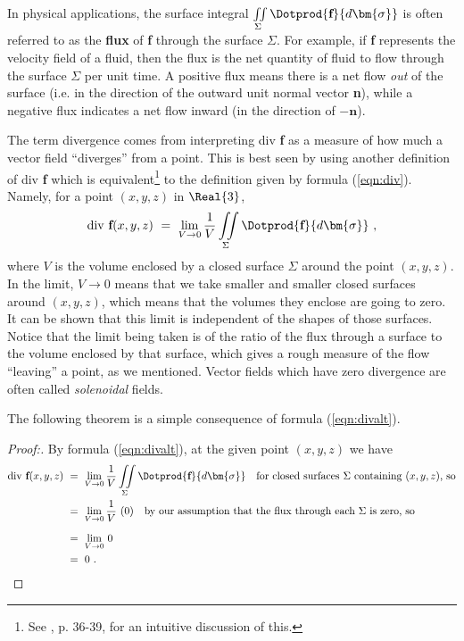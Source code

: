 In physical applications, the surface integral $\iint\limits_{\Sigma} \Dotprod{\textbf{f}}{d\bm{\sigma}}$ is often
referred to as the \textbf{flux} of \textbf{f} through the surface $\Sigma$. For example, if \textbf{f}
represents the velocity field of a fluid, then the flux
is the net quantity of fluid to flow through the surface $\Sigma$ per unit time. A
positive flux means there is a net flow \emph{out} of the surface (i.e. in the direction of the outward
unit normal vector \textbf{n}), while a negative flux indicates a net flow inward (in the direction of
$-\textbf{n}$).

The term divergence comes from interpreting div \textbf{f} as a measure of how much a vector field ``diverges''
from a point. This is best seen by using another definition of div \textbf{f} which is
equivalent\footnote{See \cite{sch}, p. 36-39, for an intuitive discussion of this.} to the definition given by
formula (\ref{eqn:div}). Namely, for a point $(x,y,z)$ in $\Real{3}$,
\begin{equation}\label{eqn:divalt}
 \text{div}~\textbf{f}(x,y,z) ~=~ \lim_{V \to 0} \frac{1}{V} \iint\limits_{\Sigma} \Dotprod{\textbf{f}}{d\bm{\sigma}} ~,
\end{equation}
where $V$ is the volume enclosed by a closed surface $\Sigma$ around the point $(x,y,z)$. In the limit, $V \to 0$ means
that we take smaller and smaller closed surfaces around $(x,y,z)$, which means that the volumes they enclose are going
to zero. It can be shown that this limit is independent of the shapes of those surfaces. Notice that the limit being
taken is of the ratio of the flux through a surface to the volume enclosed by that surface, which gives a rough
measure of the flow ``leaving'' a point, as we mentioned. Vector fields which have zero divergence are
often called \emph{solenoidal} fields.

The following theorem is a simple consequence of formula (\ref{eqn:divalt}).

\begin{proof}[Proof:]
 By formula (\ref{eqn:divalt}), at the given point $(x,y,z)$ we have 
 \begin{align*}
  \text{div}~\textbf{f}(x,y,z) ~&=~ \lim_{V \to 0} \frac{1}{V} \iint\limits_{\Sigma} \Dotprod{\textbf{f}}{d\bm{\sigma}}
   ~~~\text{for closed surfaces $\Sigma$ containing $(x,y,z)$, so}\\
    &=~ \lim_{V \to 0} \frac{1}{V} \,\, (0) ~~~\text{by our assumption that the flux through each $\Sigma$ is
    zero, so}\\[6pt]
    &=~ \lim_{V \to 0} \, 0\\
    &=~ 0 ~.\hfill
 \end{align*}
\end{proof}\vspace{-3mm}

